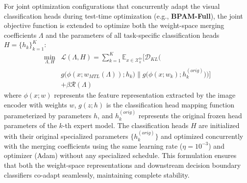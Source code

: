For joint optimization configurations that concurrently adapt the visual classification heads during test-time optimization (e.g., {\bf BPAM-Full}), the joint objective function is extended to optimize both the weight-space merging coefficients $\Lambda$ and the parameters of all task-specific classification heads $H = \{h_k\}_{k=1}^K$:
\begin{equation}
\begin{aligned}
    \min_{\Lambda, H} &\mathcal{L}(\Lambda, H) = \sum_{k=1}^K \mathbb{E}_{x \in \mathcal{X}_k^{te}} \Big[ \mathcal{D}_{KL}\Big( \\
    &g\big(\phi(x; w_{MTL}(\Lambda)); h_k\big) \parallel g\big(\phi(x; w_k); h_k^{(orig)}\big) \Big) \Big] \\
    &+ \beta \mathcal{R}(\Lambda)
\end{aligned}
\end{equation}
where $\phi(x; w)$ represents the feature representation extracted by the image encoder with weights $w$, $g(z; h)$ is the classification head mapping function parameterized by parameters $h$, and $h_k^{(orig)}$ represents the original frozen head parameters of the $k$-th expert model. The classification heads $H$ are initialized with their original specialized parameters $\{h_k^{(orig)}\}$ and optimized concurrently with the merging coefficients using the same learning rate ($\eta = 10^{-3}$) and optimizer (Adam) without any specialized schedule. This formulation ensures that both the weight-space representations and downstream decision boundary classifiers co-adapt seamlessly, maintaining complete stability.

